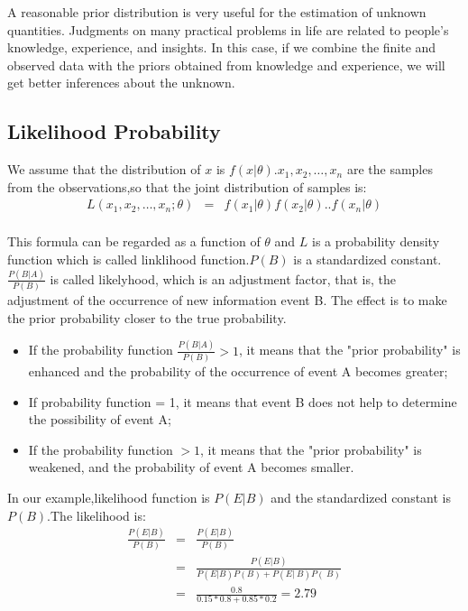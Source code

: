 A reasonable prior distribution is very useful for the estimation of unknown quantities. Judgments on many practical problems in life are related to people's knowledge, experience, and insights. In this case, if we combine the finite and observed data with the priors obtained from knowledge and experience, we will get better inferences about the unknown.



\subsection{Likelihood Probability}
We assume that the distribution of $x$ is $f(x|\theta)$.$x_1,x_2,\dots,x_n$  are the samples from the observations,so that the joint distribution of samples is:
\begin{eqnarray*}
L(x_1,x_2,\dots,x_n;\theta) &=& f(x_1|\theta)f(x_2|\theta)..f(x_n|\theta) \\
\end{eqnarray*}

This formula  can be regarded as a function of $\theta$ and $L$ is a probability density function which is called linklihood function.$P(B)$ is a standardized constant.
$\frac{P(B|A)}{P(B)}$ is called likelyhood, which is an adjustment factor, that is, the adjustment of the occurrence of new information event B. The effect is to make the prior probability closer to the true probability.
\begin{itemize}
  \item If the probability function $\frac{P(B|A)}{P(B)}>1$, it means that the "prior probability" is enhanced and the probability of the occurrence of event A becomes greater;
  \item If probability function = 1, it means that event B does not help to determine the possibility of event A;
  \item If the probability function $> 1$, it means that the "prior probability" is weakened, and the probability of event A becomes smaller.
\end{itemize}

In our example,likelihood function is $P(E|B)$ and the standardized constant is $P(B)$.The likelihood is:
\begin{eqnarray*}
  \frac{P(E|B)}{P(B)}  &=& \frac{P(E|B)}{P(B)}  \\
  & = & \frac{P(E|B)}{P(E|B)P(B)+P(E|~B)P(~B)} \\
  & = & \frac{0.8}{0.15*0.8 + 0.85 * 0.2} = 2.79\\
\end{eqnarray*}

